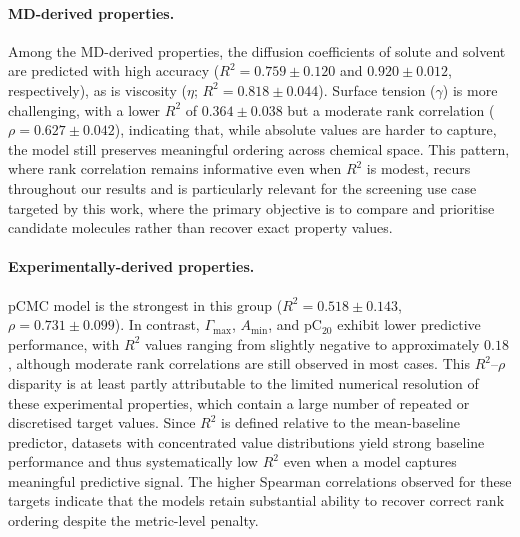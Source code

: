 \documentclass[letterpaper]{article}
\begin{document}
\paragraph{MD-derived properties.}
Among the MD-derived properties, the diffusion coefficients of solute and solvent are predicted with high accuracy ($R^2 = 0.759 \pm 0.120$ and $0.920 \pm 0.012$, respectively), as is viscosity ($\eta$; $R^2 = 0.818 \pm 0.044$). Surface tension ($\gamma$) is more challenging, with a lower $R^2$ of $0.364 \pm 0.038$ but a moderate rank correlation ($\rho = 0.627 \pm 0.042$), indicating that, while absolute values are harder to capture, the model still preserves meaningful ordering across chemical space. This pattern, where rank correlation remains informative even when $R^2$ is modest, recurs throughout our results and is particularly relevant for the screening use case targeted by this work, where the primary objective is to compare and prioritise candidate molecules rather than recover exact property values.


\paragraph{Experimentally-derived properties.}
pCMC model is the strongest in this group ($R^2 = 0.518 \pm 0.143$, $\rho = 0.731 \pm 0.099$). In contrast, $\Gamma_{\max}$, $A_{\min}$, and pC$_{20}$ exhibit lower predictive performance, with $R^2$ values ranging from slightly negative to approximately $0.18$, although moderate rank correlations are still observed in most cases. This $R^2$--$\rho$ disparity is at least partly attributable to the limited numerical resolution of these experimental properties, which contain a large number of repeated or discretised target values. Since $R^2$ is defined relative to the mean-baseline predictor, datasets with concentrated value distributions yield strong baseline performance and thus systematically low $R^2$ even when a model captures meaningful predictive signal. The higher Spearman correlations observed for these targets indicate that the models retain substantial ability to recover correct rank ordering despite the metric-level penalty.
\end{document}
